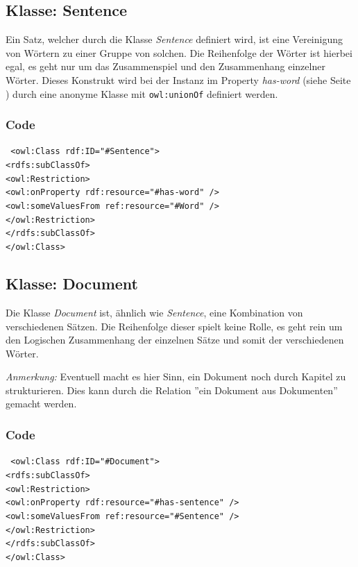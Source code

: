 ﻿\documentclass[
    11pt,
    latin1,
    a4paper,
    oneside
]{scrreprt}
\begin{document}
\subsection{Klasse: Sentence} \label{sec:class_sentence}

Ein Satz, welcher durch die Klasse \emph{Sentence} definiert wird, ist eine Vereinigung von W\"ortern zu einer Gruppe von solchen. Die Reihenfolge der Wörter ist hierbei egal, es geht nur um das Zusammenspiel und den Zusammenhang einzelner Wörter. Dieses Konstrukt wird bei der Instanz im Property \emph{has-word} (siehe  Seite \pageref{sec:rel_hasword}) durch eine anonyme Klasse mit \texttt{owl:unionOf} definiert werden.

\subsubsection{Code}  \label{sec:class_sentence_code}

\texttt{ <owl:Class rdf:ID="#Sentence"> \\
	<rdfs:subClassOf> \\
		<owl:Restriction> \\
		<owl:onProperty rdf:resource="#has-word" /> \\
		<owl:someValuesFrom ref:resource="#Word" /> \\
	</owl:Restriction> \\
	</rdfs:subClassOf> \\
</owl:Class> }


\subsection{Klasse: Document} \label{sec:class_document}

Die Klasse \emph{Document} ist, \"ahnlich wie \emph{Sentence}, eine Kombination von verschiedenen S\"atzen. Die Reihenfolge dieser spielt keine Rolle, es geht rein um den Logischen Zusammenhang der einzelnen S\"atze und somit der verschiedenen W\"orter.

\textit{Anmerkung:} Eventuell macht es hier Sinn, ein Dokument noch durch Kapitel zu strukturieren. Dies kann durch die Relation ''ein Dokument aus Dokumenten'' gemacht werden.

\subsubsection{Code}  \label{sec:class_sentence_code}

\texttt{ <owl:Class rdf:ID="#Document"> \\
	<rdfs:subClassOf> \\
		<owl:Restriction> \\
			<owl:onProperty rdf:resource="#has-sentence" /> \\
			<owl:someValuesFrom ref:resource="#Sentence" /> \\
		</owl:Restriction> \\
	</rdfs:subClassOf> \\
</owl:Class> }
\end{document}
